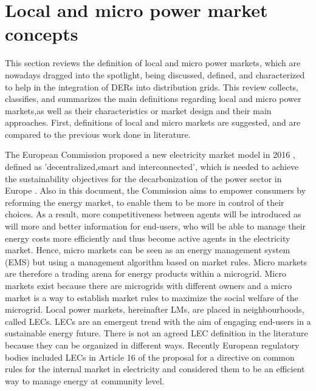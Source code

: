 \section{Local and micro power market concepts} \label{sec:localmicroconcepts}
This section reviews the definition of local and micro power markets, which are nowadays dragged into the spotlight, being discussed, defined, and characterized to help in the integration of DERs into distribution grids. This review collects, classifies, and summarizes the main definitions regarding local and micro power markets,as well as their characteristics or market design and their main approaches. First, definitions of local and micro markets are suggested, and are compared to the previous work done in literature.

The European Commission proposed a new electricity market model in 2016 \cite{validzic2017clean}, defined as 'decentralized,smart and interconnected', which is needed to achieve the sustainability objectives for the decarbonization of the power sector in Europe \cite{peng2017electricity}. Also in this document, the Commission aims to empower consumers by reforming the energy market, to enable them to be more in control of their choices. As a result, more competitiveness between agents will be introduced as will more and better information for end-users, who will be able to manage their energy costs more efficiently and thus become active agents in the electricity market.
Hence, micro markets can be seen as an energy management system (EMS) but using a management algorithm based on market rules. Micro markets are therefore a trading arena for energy products within a microgrid. Micro markets exist because there are microgrids with different owners and a micro market is a way to establish market rules to maximize the social welfare of the microgrid.
Local power markets, hereinafter LMs, are placed in neighbourhoods, called LECs. LECs are an emergent trend with the aim of engaging end-users in a sustainable energy future. There is not an agreed LEC definition in the literature because they can be organized in different ways. Recently European regulatory bodies included LECs in Article 16 of the proposal for a directive on common rules for the internal market in electricity \cite{validzic2017clean} and considered them to be an efficient way to manage energy at community level. 
